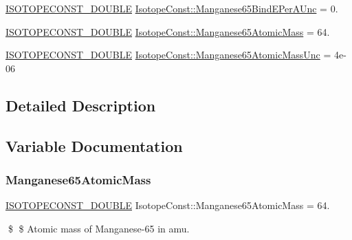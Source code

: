 \begin{DoxyCompactItemize}
\mbox{\hyperlink{group___isotope_const-_macros_ga8f45a7272ce02c0b4c65c44636ed719a}{I\+S\+O\+T\+O\+P\+E\+C\+O\+N\+S\+T\+\_\+\+D\+O\+U\+B\+LE}} \mbox{\hyperlink{group___isotope_const-_manganese-_mn65_ga6efdc527dcd643382ad3d1446385fd06}{Isotope\+Const\+::\+Manganese65\+Bind\+E\+Per\+A\+Unc}} = 0.
\item 
\mbox{\hyperlink{group___isotope_const-_macros_ga8f45a7272ce02c0b4c65c44636ed719a}{I\+S\+O\+T\+O\+P\+E\+C\+O\+N\+S\+T\+\_\+\+D\+O\+U\+B\+LE}} \mbox{\hyperlink{group___isotope_const-_manganese-_mn65_ga2b775e02de368a1c57b51faf62501700}{Isotope\+Const\+::\+Manganese65\+Atomic\+Mass}} = 64.
\item 
\mbox{\hyperlink{group___isotope_const-_macros_ga8f45a7272ce02c0b4c65c44636ed719a}{I\+S\+O\+T\+O\+P\+E\+C\+O\+N\+S\+T\+\_\+\+D\+O\+U\+B\+LE}} \mbox{\hyperlink{group___isotope_const-_manganese-_mn65_gaa6f666e793e9959a32ea0e31bd620a42}{Isotope\+Const\+::\+Manganese65\+Atomic\+Mass\+Unc}} = 4e-\/06
\end{DoxyCompactItemize}


\subsection{Detailed Description}


\subsection{Variable Documentation}
\mbox{\label{group___isotope_const-_manganese-_mn65_ga2b775e02de368a1c57b51faf62501700}} 
\subsubsection{\texorpdfstring{Manganese65\+Atomic\+Mass}{Manganese65AtomicMass}}
{\footnotesize\ttfamily \mbox{\hyperlink{group___isotope_const-_macros_ga8f45a7272ce02c0b4c65c44636ed719a}{I\+S\+O\+T\+O\+P\+E\+C\+O\+N\+S\+T\+\_\+\+D\+O\+U\+B\+LE}} Isotope\+Const\+::\+Manganese65\+Atomic\+Mass = 64.}

\$ \$ Atomic mass of Manganese-\/65 in amu. \mbox{\label{group___isotope_const-_manganese-_mn65_gaa6f666e793e9959a32ea0e31bd620a42}} 
